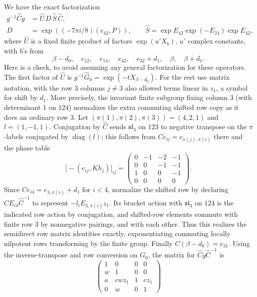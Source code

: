 We have the exact factorization
\[
 \begin{split}
 g^{-1}\widehat C g &= \widehat U\, D\, \widehat S\,\widehat C,\\
 D&=\exp((-7\pi i/8)(e_{42},P)),\qquad
 \widehat S=\exp E_{42}\exp(-E_{24})\exp E_{42},
 \end{split}
\]
where \(\widehat U\) is a fixed finite product of factors \(\exp(u' X_b)\), \(u'\) complex constants, with \(b\)'s from
\begin{equation}
 \beta-d_0,\quad e_{12},\quad e_{14},\quad e_{42},\quad
 e_{32}+d_1,\quad \beta,\quad \beta+d_1 .                                      \label{c4:Ang-1}
\end{equation}
Here is a check, to avoid assuming any general factorization for these operators. The first factor of \(\widehat U\) is \(g^{-1}\widehat G_0=\exp(-t X_{\beta-d_0})\). For the rest use matrix notation, with the row 3 columns \(j\ne3\) also allowed terms linear in \(z_1\), a symbol for shift by \(d_1\). More precisely, the invariant finite subgroup fixing column 3 (with determinant 1 on \(124\)) normalizes the extra commuting shifted row copy as it does an ordinary row 3. Let \((\pi(1),\pi(2),\pi(3))=(4,2,1)\) and \(l=(1,-1,1)\). Conjugation by \(\widehat C\) sends \(\mathfrak{sl}_3\) on \(123\) to negative transpose on the \(\pi\)-labels conjugated by \(\operatorname{diag}(l)\); this follows from \(C e_{ij}=e_{\pi(j),\pi(i)}\) there and the phase table
\[
 \big[-(e_{ij},K h_j)\big]_{ij}
 =\begin{pmatrix}0&-1&-2&-1\\0&0&-1&-1\\1&0&0&-1\\0&0&0&0\end{pmatrix}.
\]
Since \(C e_{i4}=e_{3,\pi(i)}+d_1\) for \(i<4\), normalize the shifted row by declaring \(\widehat C E_{i4}\widehat C^{-1}\) to represent \(-l_i E_{3,\pi(i)} z_1\). Its bracket action with \(\mathfrak{sl}_3\) on \(124\) is the indicated row action by conjugation, and shifted-row elements commute with finite row 3 by nonnegative pairings, and with each other. Thus this realizes the semidirect row matrix identities exactly, exponentiating commuting locally nilpotent rows transforming by the finite group. Finally \(C(\beta-d_0)=e_{31}\). Using the inverse-transpose and row conversion on \(G_0\), the matrix for \(\widehat C g\widehat C^{-1}\) is
\[
 \begin{pmatrix}
 1&0&0&0\\ w&1&0&0\\ a&c w z_1&1&c z_1\\0&w&0&1
 \end{pmatrix}
\]
